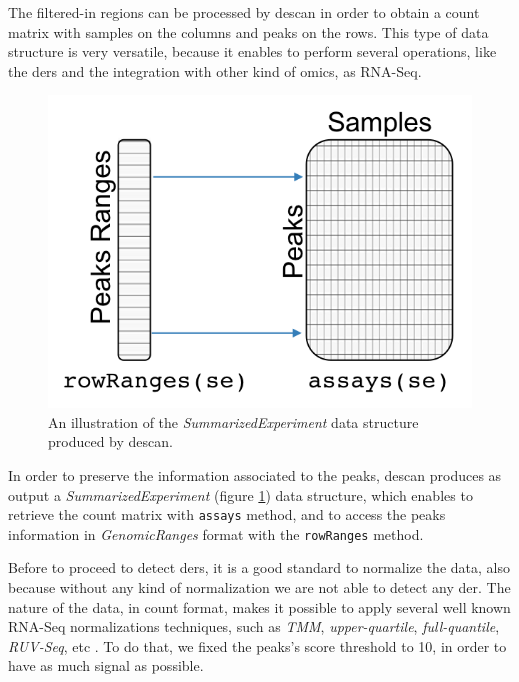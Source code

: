 The filtered-in regions can be processed by \gls{descan} in order to obtain a count matrix with samples on the columns and peaks on the rows.
This type of data structure is very versatile, because it enables to perform several operations, like the \glspl{der} and the integration with other kind of omics, as RNA-Seq.

\begin{figure}[H]
\centering
\includegraphics[keepaspectratio]{img/descan2/counts.png}
\caption[\gls{descan} counts illustration]{An illustration of the \textit{SummarizedExperiment} data structure produced by \gls{descan}.}
\label{fig:countsdescan}
\centering
\end{figure}

In order to preserve the information associated to the peaks, \gls{descan} produces as output a \textit{SummarizedExperiment} (figure \ref{fig:countsdescan}) data structure, which enables to retrieve the count matrix with \lstinline!assays! method, and to access the peaks information in \textit{GenomicRanges} format with the \lstinline!rowRanges! method.

Before to proceed to detect \glspl{der}, it is a good standard to normalize the data, also because without any kind of normalization we are not able to detect any \gls{der}.
The nature of the data, in count format, makes it possible to apply several well known RNA-Seq normalizations techniques, such as \textit{TMM}, \textit{upper-quartile}, \textit{full-quantile}, \textit{RUV-Seq}, etc \cite{Risso2014h, Robinson2010, Dillies2013}.
To do that, we fixed the peaks's score threshold to 10, in order to have as much signal as possible.

